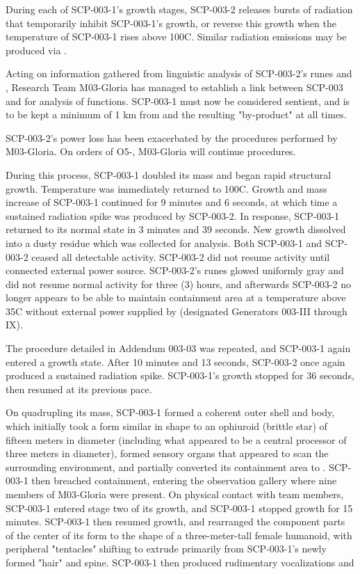 During each of SCP-003-1's growth stages, SCP-003-2 releases bursts of radiation that temporarily inhibit SCP-003-1's growth, or reverse this growth when the temperature of SCP-003-1 rises above 100\degree C. Similar radiation emissions may be produced via \expunged.

 Acting on information gathered from linguistic analysis of SCP-003-2's runes and \expunged, Research Team M03-Gloria has managed to establish a link between SCP-003 and \expunged for analysis of functions. SCP-003-1 must now be considered sentient, and is to be kept a minimum of 1 km from \expunged and the resulting "by-product" at all times.

 SCP-003-2's power loss has been exacerbated by the procedures performed by M03-Gloria. On orders of O5-, M03-Gloria will continue procedures.

 \expunged During this process, SCP-003-1 doubled its mass and began rapid structural growth. Temperature was immediately returned to 100\degree C. Growth and mass increase of SCP-003-1 continued for 9 minutes and 6 seconds, at which time a sustained radiation spike was produced by SCP-003-2. In response, SCP-003-1 returned to its normal state in 3 minutes and 39 seconds. New growth dissolved into a dusty residue which was collected for analysis. Both SCP-003-1 and SCP-003-2 ceased all detectable activity. SCP-003-2 did not resume activity until connected \redacted external power source. SCP-003-2's runes glowed uniformly gray and did not resume normal activity for three (3) hours, and afterwards \expunged SCP-003-2 no longer appears to be able to maintain containment area at a temperature above 35\degree C without external power supplied by \redacted (designated Generators 003-III through IX).

 The procedure detailed in Addendum 003-03 was repeated, and SCP-003-1 again entered a growth state. After 10 minutes and 13 seconds, SCP-003-2 once again produced a sustained radiation spike. SCP-003-1's growth stopped for 36 seconds, then resumed at its previous pace.

On quadrupling its mass, SCP-003-1 formed a coherent outer shell and body, which initially took a form similar in shape to an ophiuroid (brittle star) of fifteen meters in diameter (including what appeared to be a central processor of three meters in diameter), formed sensory organs that appeared to scan the surrounding environment, and partially converted its containment area to \redacted. SCP-003-1 then breached containment, entering the observation gallery where nine members of M03-Gloria were present. On physical contact with team members, SCP-003-1 entered stage two of its growth, and \expunged SCP-003-1 stopped growth for 15 minutes. SCP-003-1 then resumed growth, and rearranged the component parts of the center of its form to the shape of a three-meter-tall female humanoid, with peripheral "tentacles" shifting to extrude primarily from SCP-003-1's newly formed "hair" and spine. SCP-003-1 then produced rudimentary vocalizations and \expunged

